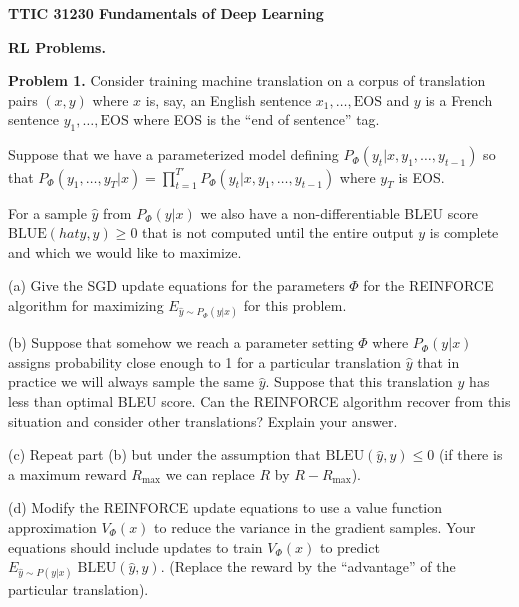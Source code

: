 \documentclass{article}
\begin{document}
\centerline{\bf TTIC 31230 Fundamentals of Deep Learning}
\bigskip
\centerline{\bf RL Problems.}

\bigskip
\bigskip
{\bf Problem 1.}
Consider training machine translation on a corpus of translation pairs $(x,y)$ where $x$ is, say, an English sentence $x_1,\ldots,\mathrm{EOS}$ and $y$ is a French sentence $y_1,\ldots,\mathrm{EOS}$
where EOS is the ``end of sentence'' tag.

\medskip
Suppose that we have a parameterized model defining $P_\Phi(y_t|x,y_1,\ldots,y_{t-1})$ so that $P_\Phi (y_1,\ldots,y_{T}|x) = \prod_{t=1}^{T'}P_\Phi(y_t|x,y_1,\ldots,y_{t-1})$ where $y_T$ is EOS.

\medskip
For a sample $\hat{y}$ from $P_\Phi(y|x)$ we also have a non-differentiable BLEU score $\mathrm{BLUE}(hat{y},y) \geq 0$ that is not computed until the entire output $y$ is complete
and which we would like to maximize.

\medskip
(a) Give the SGD update equations for the parameters $\Phi$ for the REINFORCE algorithm for maximizing $E_{\hat{y} \sim P_\Phi(y|x)}$ for this problem.

\medskip
(b) Suppose that somehow we reach a parameter setting $\Phi$ where $P_\Phi(y|x)$ assigns probability close enough to 1 for a particular translation $\hat{y}$
that in practice we will always sample the same $\hat{y}$.  Suppose that this translation $\hat{y}$ has less than optimal BLEU score.
Can the REINFORCE algorithm recover from this situation and consider other translations?  Explain your answer.

\medskip
(c) Repeat part (b) but under the assumption that $\mathrm{BLEU}(\hat{y},y) \leq 0$ (if there is a maximum reward $R_{\mathrm{max}}$ we can replace $R$ by $R- R_{\mathrm{max}}$).

\medskip
(d) Modify the REINFORCE update equations to use a value function approximation $V_\Phi(x)$ to reduce the variance in the gradient samples.  Your equations should include updates to train
$V_\Phi(x)$ to predict $E_{\hat{y} \sim P(y|x)}\;\mathrm{BLEU}(\hat{y},y)$.  (Replace the reward by the ``advantage'' of the particular translation).
\end{document}
